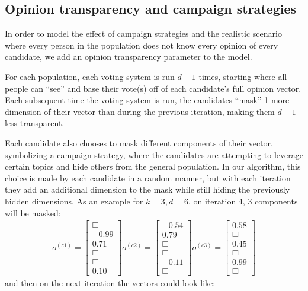 \subsection{Opinion transparency and campaign strategies}
In order to model the effect of campaign strategies and the realistic scenario where every person in the population does not know every opinion of every candidate, we add an opinion transparency parameter to the model.

For each population, each voting system is run $d-1$ times, starting where all people can ``see'' and base their vote(s) off of each candidate's full opinion vector.
Each subsequent time the voting system is run, the candidates ``mask'' 1 more dimension of their vector than during the previous iteration, making them $d-1$ less transparent.

Each candidate also chooses to mask different components of their vector, symbolizing a campaign strategy, where the candidates are attempting to leverage certain topics and hide others from the general population.
In our algorithm, this choice is made by each candidate in a random manner, but with each iteration they add an additional dimension to the mask while still hiding the previously hidden dimensions.
As an example for $k = 3, d = 6$, on iteration 4, 3 components will be masked:
\begin{align*}
o^{(c1)} = \begin{bmatrix}\Box \\ -0.99 \\ 0.71 \\ \Box \\ \Box \\ 0.10  \end{bmatrix}
o^{(c2)} = \begin{bmatrix}-0.54 \\ 0.79 \\ \Box \\ \Box \\ -0.11\\ \Box  \end{bmatrix}
o^{(c3)} = \begin{bmatrix}0.58 \\ \Box \\ 0.45 \\ \Box \\ 0.99 \\ \Box  \end{bmatrix}
\end{align*}
and then on the next iteration the vectors could look like:

